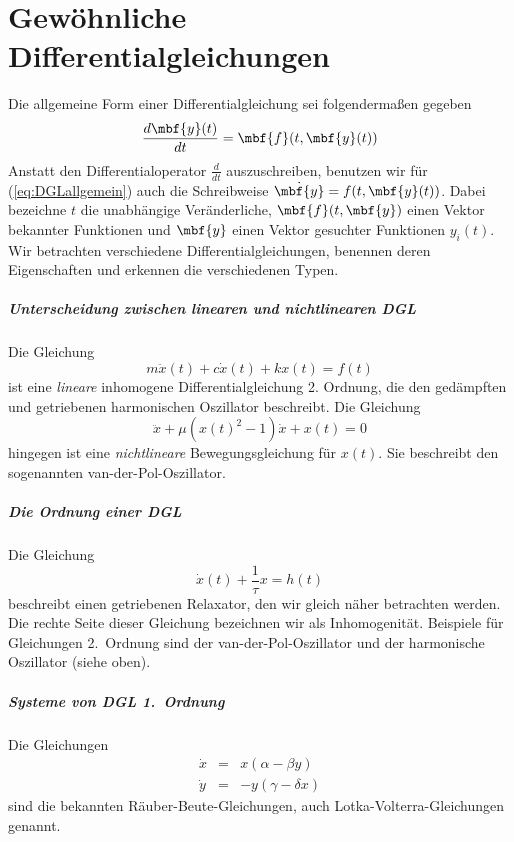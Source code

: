 \chapter{Gewöhnliche Differentialgleichungen}
Die allgemeine Form einer Differentialgleichung sei folgendermaßen gegeben
\begin{equation}
  \frac{d\mbf{y}(t)}{dt}=\mbf{f}(t,\mbf{y}(t))
  \label{eq:DGLallgemein}
\end{equation}
Anstatt den Differentialoperator $\frac{d}{dt}$ auszuschreiben, benutzen wir
für (\ref{eq:DGLallgemein}) auch die Schreibweise
$\dot{\mbf{y}}=f(t,\mbf{y}(t))$.  Dabei bezeichne $t$ die unabhängige
Veränderliche, $\mbf{f}(t,\mbf{y})$ einen Vektor bekannter Funktionen und
$\mbf{y}$ einen Vektor gesuchter Funktionen $y_i(t)$.  Wir betrachten
verschiedene Differentialgleichungen, benennen deren Eigenschaften und erkennen
die verschiedenen Typen.

\paragraph{Unterscheidung zwischen linearen und nichtlinearen DGL}
	Die Gleichung 
	  \[m\ddot{x}(t)+c\dot{x}(t)+kx(t)=f(t)\]
	  ist eine \emph{lineare} inhomogene Differentialgleichung 2. Ordnung, die den gedämpften und getriebenen harmonischen Oszillator beschreibt. Die Gleichung
	\[\ddot{x}+\mu\left(x(t)^2-1\right)\dot{x}+x(t)= 0 \]
	  hingegen ist eine \emph{nichtlineare} Bewegungsgleichung für $x(t)$. Sie beschreibt den sogenannten
	  van-der-Pol-Oszillator.  
\paragraph{Die Ordnung einer DGL}
	  Die Gleichung \[ \dot{x}(t)+\frac{1}{\tau}x=h(t)\] 
	  beschreibt einen getriebenen Relaxator, den wir gleich näher
	  betrachten werden. Die rechte Seite dieser Gleichung bezeichnen wir
	  als Inhomogenität.
	  Beispiele für Gleichungen 2.\ Ordnung sind der
	  van-der-Pol-Oszillator und der harmonische Oszillator (siehe
	  oben). 
\paragraph{Systeme von DGL 1.\ Ordnung}
    Die Gleichungen
		\begin{eqnarray*}
			\dot{x} &=& x(\alpha - \beta y) \\
			\dot{y} &=& - y(\gamma - \delta x) 
		\end{eqnarray*}
		sind die bekannten Räuber-Beute-Gleichungen, auch Lotka-Volterra-Gleichungen genannt. 
